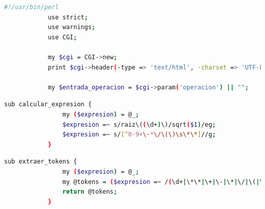 \documentclass{article}
\begin{document}
        \begin{lstlisting}[language=bash,caption={Este fragmento muestra la configuración básica para iniciar el script CGI y preparar el entorno para recibir una operación desde la interfaz web.}, label={lst:color-boton}] 
            #!/usr/bin/perl
            use strict;
            use warnings;
            use CGI;
            
            my $cgi = CGI->new;
            print $cgi->header(-type => 'text/html', -charset => 'UTF-8');

            my $entrada_operacion = $cgi->param('operacion') || "";

        \end{lstlisting}	

        \begin{lstlisting}[language=bash,caption={Aquí se utiliza una expresión regular para validar y limpiar la entrada del usuario, permitiendo solo números, operadores aritméticos, paréntesis, y el operador de potencia **.}, label={lst:color-boton}]
            sub calcular_expresion {
                my ($expresion) = @_;
                $expresion =~ s/raiz\((\d+)\)/sqrt($1)/eg;
                $expresion =~ s/[^0-9+\-*\/\(\)\s\*\*]//g;
            }

        \end{lstlisting}

        \begin{lstlisting}[language=bash,caption={En esta sección divide la expresión matemática en tokens, como números y operadores, usando una expresión regular que identifica patrones específicos.}, label={lst:color-boton}]
            sub extraer_tokens {
                my ($expresion) = @_;
                my @tokens = ($expresion =~ /(\d+|\*\*|\+|\-|\*|\/|\(|\))/g);
                return @tokens;
            }

        \end{lstlisting}
\end{document}
